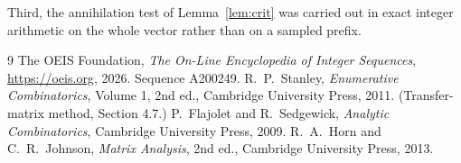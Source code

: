 \documentclass[11pt,a4paper]{article}
\theoremstyle{plain}
\theoremstyle{definition}
\begin{document}
Third, the annihilation test of Lemma~\ref{lem:crit} was carried out in exact integer
arithmetic on the whole vector rather than on a sampled prefix.

\begin{thebibliography}{9}
 The OEIS Foundation, \emph{The On-Line Encyclopedia of Integer
Sequences}, \url{https://oeis.org}, 2026. Sequence A200249.
 R.~P.~Stanley, \emph{Enumerative Combinatorics}, Volume 1, 2nd ed.,
Cambridge University Press, 2011. (Transfer-matrix method, Section 4.7.)
 P.~Flajolet and R.~Sedgewick, \emph{Analytic Combinatorics}, Cambridge
University Press, 2009.
 R.~A.~Horn and C.~R.~Johnson, \emph{Matrix Analysis}, 2nd ed., Cambridge
University Press, 2013.
\end{thebibliography}
\end{document}
